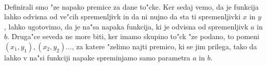 \paragraph{}
Definirali smo "ze napako premice za dane to"cke. Ker sedaj vemo, da je funkcija lahko odvisna od ve"cih spremenljivk in da ni nujno da sta ti spremenljivki $x$ in $y$, lahko ugotovimo, da je na"sa napaka funkcija, ki je odvisna od spremenljivk $a$ in $b$. Druga"ce seveda ne more biti, ker imamo skupino to"ck "ze podano, to pomeni $(x_1, y_1), (x_2, y_2) \ldots$, za katere "zelimo najti premico, ki se jim prilega, tako da lahko v na"si funkciji napake spreminjamo samo parametra $a$ in $b$.
